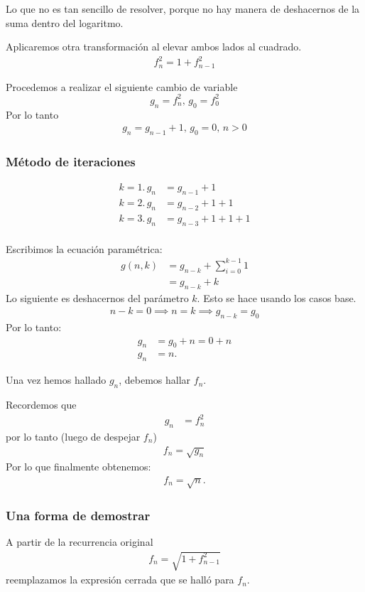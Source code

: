 Lo que no es tan sencillo de resolver, porque no hay manera de deshacernos de la suma dentro del logaritmo.

Aplicaremos otra transformación al elevar ambos lados al cuadrado.
\begin{align*}
	f_n^2=1+f^2_{n-1}
\end{align*}

Procedemos a realizar el siguiente cambio de variable
$$g_n=f_{n}^2,\,g_0=f_0^2$$
Por lo tanto
\begin{align*}
g_n=g_{n-1}+1,\,g_0=0,\,n>0
\end{align*}

\subsubsection{Método de iteraciones}
\begin{align*}
k=1.\,g_n&=g_{n-1}+1\\
k=2.\,g_n&=g_{n-2}+1+1\\
k=3.\,g_n&=g_{n-3}+1+1+1\\
\end{align*}

Escribimos la ecuación paramétrica:
\begin{align*}
g(n,k)&=g_{n-k}+\sum_{i=0}^{k-1}{1}\\
&=g_{n-k}+k
\end{align*}
Lo siguiente es deshacernos del parámetro $k$. Esto se hace usando los casos base.
\begin{align*}
n-k=0\implies n=k\implies g_{n-k}=g_0
\end{align*}
Por lo tanto:
\begin{align*}
g_n&=g_0+n=0+n\\
g_n&=n.
\end{align*}

Una vez hemos hallado $g_n$, debemos hallar $f_n$.

Recordemos que
\begin{align*}
g_n&=f_{n}^2
\end{align*}
por lo tanto (luego de despejar $f_n$)
\begin{align*}
f_n=\sqrt{g_n}
\end{align*}
Por lo que finalmente obtenemos:
\begin{align*}
f_n=\sqrt{n}.
\end{align*}

\subsubsection{Una forma de demostrar}
A partir de la recurrencia original
\begin{align*}
	f_n=\sqrt{1+f_{n-1}^2}
\end{align*}
reemplazamos la expresión cerrada que se halló para $f_n$.

